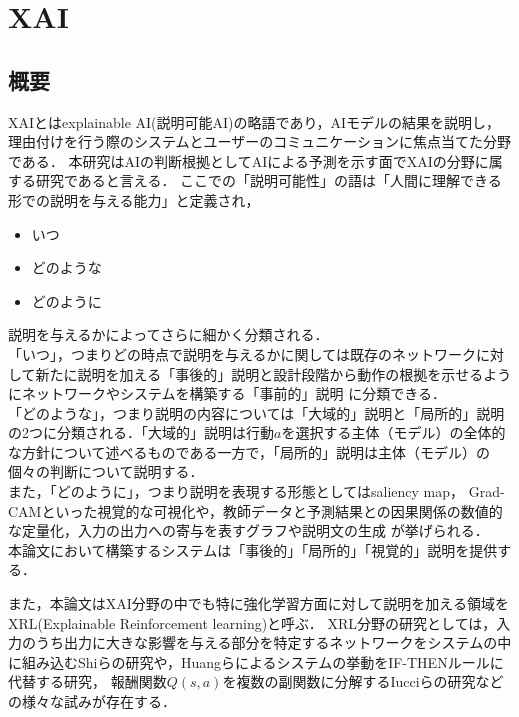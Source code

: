 \section{XAI}

\subsection{概要}
XAIとはexplainable AI(説明可能AI)の略語であり，AIモデルの結果を説明し，理由付けを行う際のシステムとユーザーのコミュニケーションに焦点当てた分野である\cite{consider}．
本研究はAIの判断根拠としてAIによる予測を示す面でXAIの分野に属する研究であると言える．
ここでの「説明可能性」の語は「人間に理解できる形での説明を与える能力」\cite{definition}と定義され，
\begin{itemize}
    \item いつ
    \item どのような
    \item どのように
\end{itemize}
説明を与えるかによってさらに細かく分類される．\\
「いつ」，つまりどの時点で説明を与えるかに関しては既存のネットワークに対して新たに説明を加える「事後的」説明と設計段階から動作の根拠を示せるようにネットワークやシステムを構築する「事前的」説明
に分類できる\cite{definition}．\\
「どのような」，つまり説明の内容については「大域的」説明と「局所的」説明の2つに分類される．「大域的」説明は行動$a$を選択する主体（モデル）の全体的な方針について述べるものである一方で，「局所的」説明は主体（モデル）の個々の判断について説明する\cite{gl}．\\
また，「どのように」，つまり説明を表現する形態としてはsaliency map\cite{saliency}， Grad-CAM\cite{Grad-CAM}といった視覚的な可視化や，教師データと予測結果との因果関係の数値的な定量化\cite{定量}，入力の出力への寄与を表すグラフや説明文の生成\cite{LIME}
が挙げられる．\\
本論文において構築するシステムは「事後的」「局所的」「視覚的」説明を提供する．

また，本論文はXAI分野の中でも特に強化学習方面に対して説明を加える領域をXRL(Explainable Reinforcement learning)と呼ぶ\cite{XRL}．
XRL分野の研究としては，入力のうち出力に大きな影響を与える部分を特定するネットワークをシステムの中に組み込むShiらの研究\cite{DBLP:journals/corr/abs-2003-07069}や，Huangらによるシステムの挙動をIF-THENルールに代替する研究\cite{Huang2020InterpretablePF}， 報酬関数$Q(s, a)$を複数の副関数に分解するIucciらの研究\cite{9659472}などの様々な試みが存在する．



